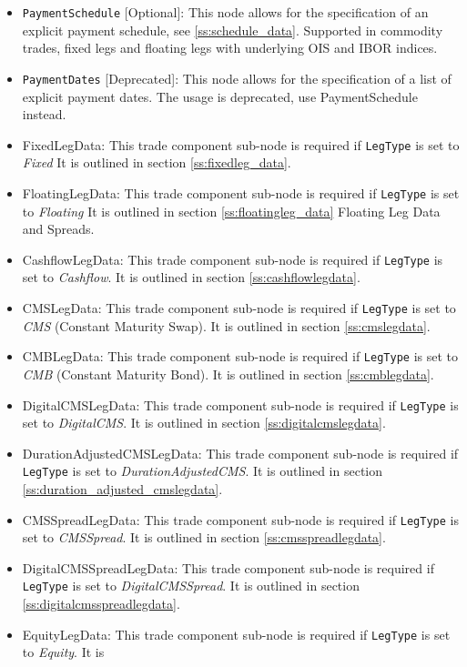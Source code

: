 \begin{itemize}
\item \lstinline!PaymentSchedule! [Optional]: This node allows for the specification of an explicit payment schedule,
  see \ref{ss:schedule_data}. Supported in commodity trades, fixed legs and floating legs with underlying OIS and IBOR
  indices.
\item \lstinline!PaymentDates! [Deprecated]: This node allows for the specification of a list of explicit payment
  dates. The usage is deprecated, use PaymentSchedule instead.

\item FixedLegData: This trade component sub-node is required if \lstinline!LegType! is set to \emph{Fixed} It is
outlined in section \ref{ss:fixedleg_data}.
\item FloatingLegData: This trade component sub-node is required if \lstinline!LegType! is set to \emph{Floating} It is
outlined in section \ref{ss:floatingleg_data} Floating Leg Data and Spreads.
\item CashflowLegData: This trade component sub-node is required if \lstinline!LegType! is set to \emph{Cashflow}. It is
  outlined in section \ref{ss:cashflowlegdata}.
\item CMSLegData: This trade component sub-node is required if \lstinline!LegType! is set to \emph{CMS} (Constant Maturity Swap). It is
  outlined in section \ref{ss:cmslegdata}.
  \item CMBLegData: This trade component sub-node is required if \lstinline!LegType! is set to \emph{CMB} (Constant Maturity Bond). It is
  outlined in section \ref{ss:cmblegdata}. 
\item DigitalCMSLegData: This trade component sub-node is required if \lstinline!LegType! is set to \emph{DigitalCMS}. It is
  outlined in section \ref{ss:digitalcmslegdata}.
\item DurationAdjustedCMSLegData: This trade component sub-node is required if \lstinline!LegType! is set to \emph{DurationAdjustedCMS}. It is
  outlined in section \ref{ss:duration_adjusted_cmslegdata}.  
\item CMSSpreadLegData: This trade component sub-node is required if \lstinline!LegType! is set to \emph{CMSSpread}. It is
  outlined in section \ref{ss:cmsspreadlegdata}.
\item DigitalCMSSpreadLegData: This trade component sub-node is required if \lstinline!LegType! is set to \emph{DigitalCMSSpread}. It is
  outlined in section \ref{ss:digitalcmsspreadlegdata}.
\item EquityLegData: This trade component sub-node is required if \lstinline!LegType! is set to \emph{Equity}. It is

\end{itemize}
